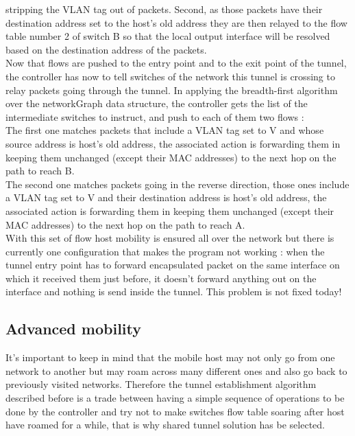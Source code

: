 \documentclass{article}
\begin{document}
stripping the VLAN tag out of packets. Second, as those packets
have their destination address set to the host's old address they
are then relayed to the flow table number 2 of switch B so that
the local output interface will be resolved based on the
destination address of the packets.\\
\newline
Now that flows are pushed to the entry point and to the exit point of
the tunnel, the controller has now to tell switches of the network
this tunnel is crossing to relay packets going through the tunnel. In
applying the breadth-first algorithm over the networkGraph data
structure, the controller gets the list of the intermediate switches to
instruct, and push to each of them two flows : \\
\newline
The first one matches packets that include a VLAN tag set to V and
whose source address is host's old address, the associated action is
forwarding them in keeping them unchanged (except their MAC
addresses) to the next hop on the path to reach B.\\
\newline
The second one matches packets going in the reverse direction, those
ones include a VLAN tag set to V and their destination address is host's
old address, the associated action is forwarding them in keeping them
unchanged (except their MAC addresses) to the next hop on the path to
reach A.\\
\newline
With this set of flow host mobility is ensured all over the network
but there is currently one configuration that makes the program not
working : when the tunnel entry point has to forward encapsulated
packet on the same interface on which it received them just before,
it doesn't forward anything out on the interface and nothing is send
inside the tunnel. This problem is not fixed today!

\subsection{Advanced mobility}
It's important to keep in mind that the mobile host may not only go
from one network to another but may roam across many different ones
and also go back to previously visited networks. Therefore the tunnel
establishment algorithm described before is a trade between having a
simple sequence of operations to be done by the controller and try not
to make switches flow table soaring after host have roamed for a
while, that is why shared tunnel solution has be selected.
\end{document}
